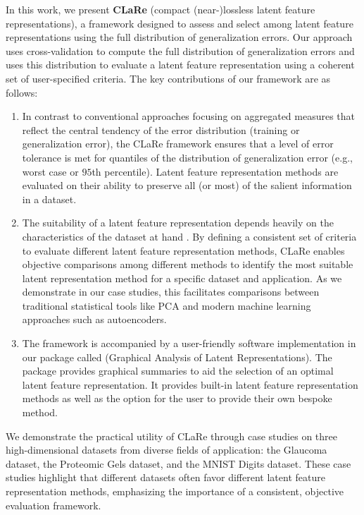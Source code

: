 In this work, we present \textbf{CLaRe} (compact (near-)lossless latent feature representations), a framework designed to assess and select among latent feature representations using the full distribution of generalization errors.
Our approach uses cross-validation to compute the full distribution of generalization errors and uses this distribution to evaluate a latent feature representation using a coherent set of user-specified criteria.
The key contributions of our framework are as follows:
\begin{enumerate}
    \item In contrast to conventional approaches focusing on aggregated measures that reflect the central tendency of the error distribution (training or generalization error), the CLaRe framework ensures that a level of error tolerance is met for quantiles of the distribution of generalization error (e.g., worst case or $95$th percentile). Latent feature representation methods are evaluated on their ability to preserve all (or most) of the salient information in a dataset.
    \item The suitability of a latent feature representation depends heavily on the characteristics of the dataset at hand \parencite[Section 3, pp. 325--328]{morris_functional_2015}.
    By defining a consistent set of criteria to evaluate different latent feature representation methods, CLaRe enables objective comparisons among different methods to identify the most suitable latent representation method for a specific dataset and application.
    As we demonstrate in our case studies, this facilitates comparisons between traditional statistical tools like PCA and modern machine learning approaches such as autoencoders.
    \item The framework is accompanied by a user-friendly software implementation in our  package called  (Graphical Analysis of Latent Representations).
    The package provides graphical summaries to aid the selection of an optimal latent feature representation.
    It provides built-in latent feature representation methods as well as the option for the user to provide their own bespoke method.
\end{enumerate}
We demonstrate the practical utility of CLaRe through case studies on three high-dimensional datasets from diverse fields of application: the Glaucoma dataset, the Proteomic Gels dataset, and the MNIST Digits dataset.
These case studies highlight that different datasets often favor different latent feature representation methods, emphasizing the importance of a consistent, objective evaluation framework.


